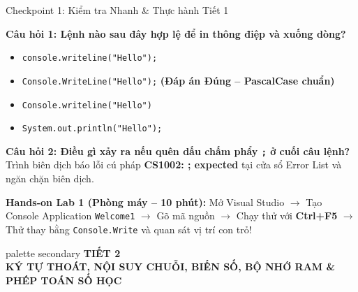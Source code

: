 \documentclass[aspectratio=169, 10pt]{beamer}
\begin{document}
\begin{frame}{Checkpoint 1: Kiểm tra Nhanh \& Thực hành Tiết 1}
  \begin{block}{\textbf{Câu hỏi 1: Lệnh nào sau đây hợp lệ để in thông điệp và xuống dòng?}}
    \begin{itemize}
      \item[A.] \texttt{console.writeline("Hello");}
      \item[B.] \texttt{Console.WriteLine("Hello");} \textbf{(Đáp án Đúng -- PascalCase chuẩn)}
      \item[C.] \texttt{Console.writeline("Hello")}
      \item[D.] \texttt{System.out.println("Hello");}
    \end{itemize}
  \end{block}

  \begin{alertblock}{\textbf{Câu hỏi 2: Điều gì xảy ra nếu quên dấu chấm phẩy \texttt{;} ở cuối câu lệnh?}}
    Trình biên dịch báo lỗi cú pháp \textbf{CS1002: ; expected} tại cửa sổ Error List và ngăn chặn biên dịch.
  \end{alertblock}

  \begin{exampleblock}{\textbf{Hands-on Lab 1 (Phòng máy -- 10 phút):}}
    Mở Visual Studio $\to$ Tạo Console Application \texttt{Welcome1} $\to$ Gõ mã nguồn $\to$ Chạy thử với \textbf{Ctrl+F5} $\to$ Thử thay bằng \texttt{Console.Write} và quan sát vị trí con trỏ!
  \end{exampleblock}
\end{frame}

\begin{frame}[plain]
  \vfill
  \centering
  \begin{beamercolorbox}[sep=8pt,center,shadow=true,rounded=true]{palette secondary}
    {\Huge \textbf{TIẾT 2}}\\[2mm]
    {\Large \textbf{KÝ TỰ THOÁT, NỘI SUY CHUỖI, BIẾN SỐ, BỘ NHỚ RAM \& PHÉP TOÁN SỐ HỌC}}
  \end{beamercolorbox}
  \vfill
\end{frame}
\end{document}
